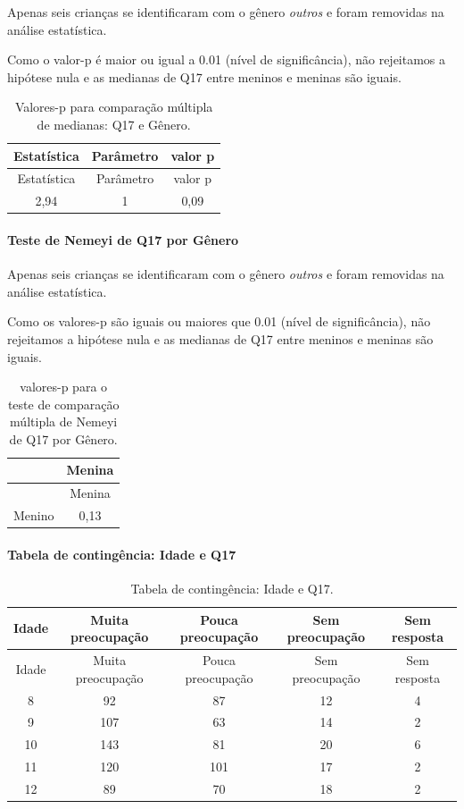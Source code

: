 \documentclass[]{article}
\let\oldparagraph\paragraph
\renewcommand{\paragraph}[1]{\oldparagraph{#1}\mbox{}}
\begin{document}
Apenas seis crianças se identificaram com o gênero \emph{outros} e foram removidas na análise estatística.

Como o valor-p é maior ou igual a 0.01 (nível de significância), não rejeitamos a hipótese nula e as medianas de Q17 entre meninos e meninas são iguais.

\begin{longtable}[]{@{}ccc@{}}
\caption{\label{tab:unnamed-chunk-207}Valores-p para comparação múltipla de medianas: Q17 e Gênero.}\tabularnewline
\toprule
Estatística & Parâmetro & valor p\tabularnewline
\midrule
\endfirsthead
\toprule
Estatística & Parâmetro & valor p\tabularnewline
\midrule
\endhead
2,94 & 1 & 0,09\tabularnewline
\bottomrule
\end{longtable}

\hypertarget{teste-de-nemeyi-de-q17-por-guxeanero}{%
\paragraph{Teste de Nemeyi de Q17 por Gênero}\label{teste-de-nemeyi-de-q17-por-guxeanero}}

Apenas seis crianças se identificaram com o gênero \emph{outros} e foram removidas na análise estatística.

Como os valores-p são iguais ou maiores que 0.01 (nível de significância), não rejeitamos a hipótese nula e as medianas de Q17 entre meninos e meninas são iguais.

\begin{longtable}[]{@{}lc@{}}
\caption{\label{tab:unnamed-chunk-209}valores-p para o teste de comparação múltipla de Nemeyi de Q17 por Gênero.}\tabularnewline
\toprule
& Menina\tabularnewline
\midrule
\endfirsthead
\toprule
& Menina\tabularnewline
\midrule
\endhead
Menino & 0,13\tabularnewline
\bottomrule
\end{longtable}

\cleardoublepage

\hypertarget{tabela-de-continguxeancia-idade-e-q17}{%
\paragraph{Tabela de contingência: Idade e Q17}\label{tabela-de-continguxeancia-idade-e-q17}}

\begin{longtable}[]{@{}ccccc@{}}
\caption{\label{tab:unnamed-chunk-210}Tabela de contingência: Idade e Q17.}\tabularnewline
\toprule
Idade & Muita preocupação & Pouca preocupação & Sem preocupação & Sem resposta\tabularnewline
\midrule
\endfirsthead
\toprule
Idade & Muita preocupação & Pouca preocupação & Sem preocupação & Sem resposta\tabularnewline
\midrule
\endhead
8 & 92 & 87 & 12 & 4\tabularnewline
9 & 107 & 63 & 14 & 2\tabularnewline
10 & 143 & 81 & 20 & 6\tabularnewline
11 & 120 & 101 & 17 & 2\tabularnewline
12 & 89 & 70 & 18 & 2\tabularnewline
\bottomrule
\end{longtable}
\end{document}
